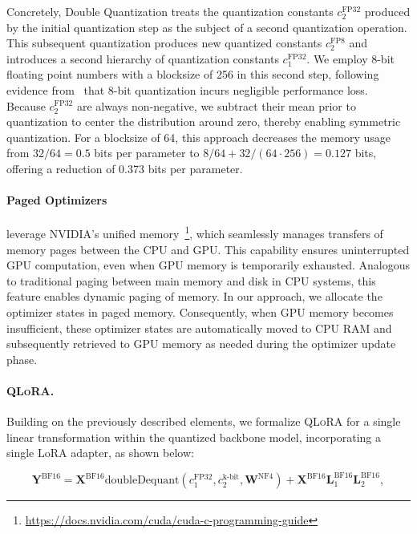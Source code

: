 Concretely, Double Quantization treats the quantization constants $c_2^{\text{FP32}}$ produced by the initial quantization step as the subject of a second quantization operation. This subsequent quantization produces new quantized constants $c_2^{\text{FP8}}$ and introduces a second hierarchy of quantization constants $c_1^{\text{FP32}}$. We employ 8-bit floating point numbers with a blocksize of 256 in this second step, following evidence from~\citet{dettmers2022case} that 8-bit quantization incurs negligible performance loss. Because $c_2^{\text{FP32}}$ are always non-negative, we subtract their mean prior to quantization to center the distribution around zero, thereby enabling symmetric quantization. For a blocksize of 64, this approach decreases the memory usage from $32/64=0.5$ bits per parameter to $8/64 + 32/(64\cdot256) = 0.127$ bits, offering a reduction of 0.373 bits per parameter.

\paragraph{Paged Optimizers} leverage NVIDIA's unified memory~\footnote{\tiny \url{https://docs.nvidia.com/cuda/cuda-c-programming-guide}}, which seamlessly manages transfers of memory pages between the CPU and GPU. This capability ensures uninterrupted GPU computation, even when GPU memory is temporarily exhausted. Analogous to traditional paging between main memory and disk in CPU systems, this feature enables dynamic paging of memory. In our approach, we allocate the optimizer states in paged memory. Consequently, when GPU memory becomes insufficient, these optimizer states are automatically moved to CPU RAM and subsequently retrieved to GPU memory as needed during the optimizer update phase.

\paragraph{\textsc{QLoRA}.} Building on the previously described elements, we formalize \textsc{QLoRA} for a single linear transformation within the quantized backbone model, incorporating a single LoRA adapter, as shown below:

\begin{equation}
    \mathbf{Y}^{\text{BF16}} =  \mathbf{X}^{\text{BF16}} \text{doubleDequant}(c_1^{\text{FP32}}, c_2^{\text{k-bit}}, \mathbf{W}^{\text{NF4}}) + \mathbf{X}^{\text{BF16}}\mathbf{L}^{\text{BF16}}_1\mathbf{L}^{\text{BF16}}_2,
\end{equation}

